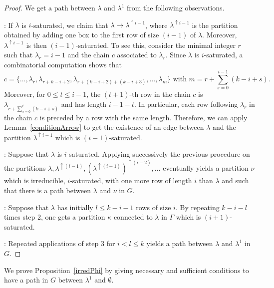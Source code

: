 \documentclass[10pt,a4paper]{amsart}
\theoremstyle{definition}
\begin{document}
\begin{proof}
We get a path between $\lambda$ and $\lambda^{1}$ from the following observations.

: If $\lambda$ is $i$-saturated, we claim that $\lambda
\rightarrow\lambda^{\uparrow i-1}$, where $\lambda^{\uparrow i-1}$ is the
partition obtained by adding one box to the first row of size $(i-1)$ of
$\lambda$. Moreover, $\lambda^{\uparrow i-1}$ is then $(i-1)$-saturated. To
see this, consider the minimal integer $r$ such that $\lambda_{r}=i-1$ and the
chain $c$ associated to $\lambda_{r}$. Since $\lambda$ is $i$-saturated, a
combinatorial computation shows that
\[
c=\{\ldots,\lambda_{r},\lambda_{r+k-i+2},\lambda_{r+(k-i+2)+(k-i+3)}%
,\ldots,\lambda_{m}\}\text{ with }m=r+\sum_{s=0}^{i-1}(k-i+s).
\]
Moreover, for $0\leq t\leq i-1$, the $(t+1)$-th row in the chain $c$ is
$\lambda_{r+\sum_{s=0}^{t}(k-i+s)}$ and has length $i-1-t$. In particular,
each row following $\lambda_{r}$ in the chain $c$ is preceded by a row with
the same length. Therefore, we can apply Lemma~\ref{conditionArrow} to get the
existence of an edge between $\lambda$ and the partition $\lambda^{\uparrow
i-1}$ which is $(i-1)$-saturated.

: Suppose that $\lambda$ is $i$-saturated. Applying successively the
previous procedure on the partitions $\lambda,\lambda^{\uparrow(i-1)}%
,(\lambda^{\uparrow(i-1)})^{\uparrow(i-2)},\dots$ eventually yields a
partition $\nu$ which is irreducible, $i$-saturated, with one more row of
length $i$ than $\lambda$ and such that there is a path between $\lambda$ and
$\nu$ in $G$.

: Suppose that $\lambda$ has initially $l\leq k-i-1$ rows of size
$i$. By repeating $k-i-l$ times step 2, one gets a partition $\kappa$
connected to $\lambda$ in $\Gamma$ which is $(i+1)$-saturated.

: Repeated applications of step 3 for $i<l\leq k$ yields a path
between $\lambda$ and $\lambda^{1}$ in~$G$.
\end{proof}

We prove Proposition~\ref{irredPhi} by giving necessary and sufficient
conditions to have a path in $G$ between $\lambda^{1}$ and $\emptyset$.
\end{document}
